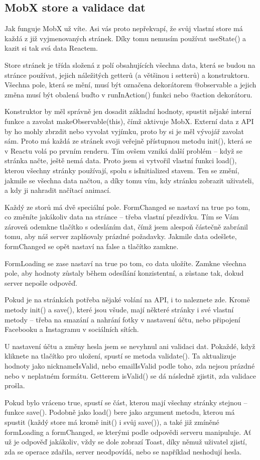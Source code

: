 \subsection{MobX store a validace dat}
Jak funguje MobX už víte. Asi vás proto nepřekvapí, že svůj vlastní store má každá z již vyjmenovaných stránek. Díky tomu nemusím používat useState() a kazit si tak svá data Reactem.

Store stránek je třída složená z polí obsahujících všechna data, která se budou na stránce používat, jejich náležitých getterů (a většinou i setterů) a konstruktoru. Všechna pole, která se mění, musí být označena dekorátorem @observable a jejich změna musí být obalená buďto v runInAction() funkci nebo @action dekorátoru.

Konstruktor by měl správně jen dosadit základní hodnoty, spustit nějaké interní funkce a zavolat makeObservable(this), čímž aktivuje MobX. Externí data z API by ho mohly zbrzdit nebo vyvolat vyjímku, proto by si je měl vývojář zavolat sám. Proto má každá ze stránek svoji veřejně přístupnou metodu init(), která se v Reactu volá po prvním renderu. Tím ovšem vzniká další problém – když se stránka načte, ještě nemá data. Proto jsem si vytvořil vlastní funkci load(), kterou všechny stránky používají, spolu s isInitialized stavem. Ten se změní, jakmile se všechna data načtou, a díky tomu vím, kdy stránku zobrazit uživateli, a kdy ji nahradit načítací animací.

Každý ze storů má dvě speciální pole. FormChanged se nastaví na true po tom, co změníte jakákoliv data na stránce – třeba vlastní přezdívku. Tím se Vám zároveň odemkne tlačítko s odesláním dat, čímž jsem alespoň částečně zabránil tomu, aby náš server zaplňovaly prázdné požadavky. Jakmile data odešlete, formChanged se opět nastaví na false a tlačítko zamkne.

FormLoading se zase nastaví na true po tom, co data uložíte. Zamkne všechna pole, aby hodnoty zůstaly během odesílání konzistentní, a zůstane tak, dokud server nepošle odpověď.

Pokud je na stránkách potřeba nějaké volání na API, i to naleznete zde. Kromě metody init() a save(), které jsou všude, mají některé stránky i své vlastní metody – třeba na smazání a nahrání fotky v nastavení účtu, nebo připojení Facebooku a Instagramu v sociálních sítích.

U nastavení účtu a změny hesla jsem se nevyhnul ani validaci dat. Pokaždé, když kliknete na tlačítko pro uložení, spustí se metoda validate(). Ta aktualizuje hodnoty jako nicknameIsValid, nebo emailIsValid podle toho, zda nejsou prázdné nebo v neplatném formátu. Getterem isValid() se dá následně zjistit, zda validace prošla.

Pokud bylo vráceno true, spustí se část, kterou mají všechny stránky stejnou – funkce save(). Podobně jako load() bere jako argument metodu, kterou má spustit (každý store má kromě init() i svůj save()), a také již zmíněné formLoading a formChanged, se kterými podle odpovědi serveru manipuluje. Ať už je odpověď jakákoliv, vždy se dole zobrazí Toast, díky němuž uživatel zjistí, zda se operace zdařila, server neodpovídá, nebo se například neshodují hesla.